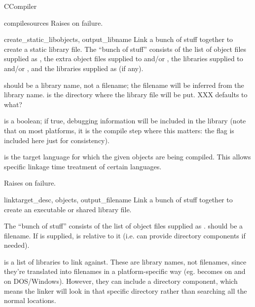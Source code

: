 \documentclass{manual}
\begin{document}
\begin{classdesc}{CCompiler}{}
\begin{methoddesc}{compile}{sources}
Raises  on failure.
\end{methoddesc}

\begin{methoddesc}{create_static_lib}{objects, output_libname}
Link a bunch of stuff together to create a static library file.
The ``bunch of stuff'' consists of the list of object files supplied
as , the extra object files supplied to
 and/or , the libraries
supplied to  and/or , and the
libraries supplied as  (if any).

 should be a library name, not a filename; the
filename will be inferred from the library name.   is
the directory where the library file will be put. XXX defaults to what?

 is a boolean; if true, debugging information will be
included in the library (note that on most platforms, it is the
compile step where this matters: the  flag is included here
just for consistency).

 is the target language for which the given objects
are being compiled. This allows specific linkage time treatment of
certain languages.

Raises  on failure.
\end{methoddesc}

\begin{methoddesc}{link}{target_desc, objects, output_filename}
Link a bunch of stuff together to create an executable or
shared library file.

The ``bunch of stuff'' consists of the list of object files supplied
as .   should be a filename.  If
 is supplied,  is relative to it
(i.e.  can provide directory components if
needed).

 is a list of libraries to link against.  These are
library names, not filenames, since they're translated into
filenames in a platform-specific way (eg.  becomes 
on \UNIX{} and  on DOS/Windows).  However, they can include a
directory component, which means the linker will look in that
specific directory rather than searching all the normal locations.


\end{methoddesc}
\end{classdesc}
\end{document}
